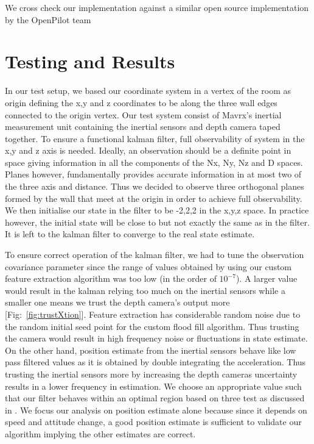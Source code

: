 \documentclass[]{article}
\begin{document}
{	We cross check our implementation against a similar open source implementation by the OpenPilot team %



\section{Testing and Results} %
\label{sub:testing_kalman}
In our test setup, we based our coordinate system in a vertex of the room as origin defining the x,y and z coordinates to be along the three wall edges connected to the origin vertex. Our test system consist of Mavrx's inertial measurement unit containing the inertial sensors and depth camera taped together. To ensure a functional kalman filter, full observability of system in the x,y and z axis is needed. Ideally, an observation should be a definite point in space giving information in all the components of the Nx, Ny, Nz and D spaces. Planes however, fundamentally provides accurate information in at most two of the three axis and distance.  Thus we decided to observe three orthogonal planes formed by the wall that meet at the origin in order to achieve full observability. We then initialise our state in the filter to be -2,2,2 in the x,y,z space. In practice however, the initial state will be close to but not exactly the same as in the filter. It is left to the kalman filter to converge to the real state estimate.

To ensure correct operation of the kalman filter, we had to tune the observation covariance parameter since the range of values obtained by using our custom feature extraction algorithm was too low (in the order of $10^{-7}$). A larger value would result in the kalman relying too much on the inertial sensors while a smaller one means we trust the depth camera's output more [Fig:~\ref{fig:trustXtion}]. Feature extraction has considerable random noise due to the random initial seed point for the custom flood fill algorithm. Thus trusting the camera would result in high frequency noise or fluctuations in state estimate. On the other hand, position estimate from the inertial sensors behave like low pass filtered values as it is obtained by double integrating the acceleration. Thus trusting the inertial sensors more by increasing the depth cameras uncertainty results in a lower frequency in estimation. We choose an appropriate value such that our filter behaves within an optimal region based on three test as discussed in \cite{KalmanTuning} . We focus our analysis on position estimate alone because since it depends on speed and attitude change, a good position estimate is sufficient to validate our algorithm implying the other estimates are correct. 

}
\end{document}
